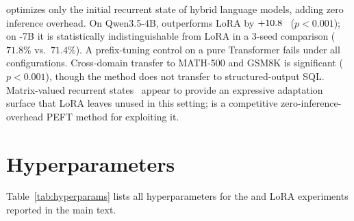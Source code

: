 \documentclass{article}
\begin{document}
\method optimizes only the initial recurrent state of hybrid language models,
adding zero inference overhead. On Qwen3.5-4B, \methodshort outperforms LoRA by
$+10.8$~\pp{} ($p < 0.001$); on \falcon-7B it is statistically
indistinguishable from LoRA in a 3-seed comparison ($71.8\%$ vs.\ $71.4\%$). A
prefix-tuning control on a pure Transformer fails under all configurations.
Cross-domain transfer to MATH-500 and GSM8K is significant ($p < 0.001$),
though the method does not transfer to structured-output SQL.
Matrix-valued recurrent states~\cite{galim_peft_ssm} appear to provide an
expressive adaptation surface that LoRA leaves unused in this setting;
\methodshort is a competitive zero-inference-overhead PEFT method for
exploiting it.




\appendix

\section{Hyperparameters}
\label{app:hyperparams}

Table~\ref{tab:hyperparams} lists all hyperparameters for the \methodshort and LoRA experiments reported in the main text.
\end{document}

